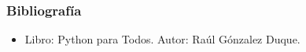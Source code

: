 \begin{frame}[fragile]
  \frametitle{Bibliograf\'ia}

  \begin{itemize}
    \item Libro: Python para Todos. Autor: Ra\'ul G\'onzalez Duque.
  \end{itemize}

\end{frame}

